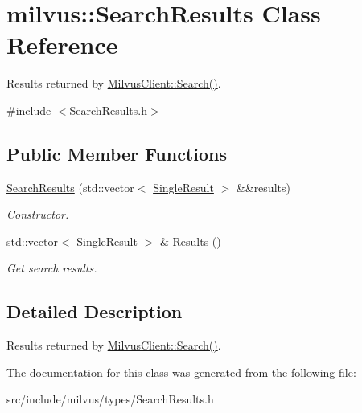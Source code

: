 \hypertarget{classmilvus_1_1_search_results}{}\section{milvus\+:\+:Search\+Results Class Reference}
\label{classmilvus_1_1_search_results}


Results returned by \hyperlink{classmilvus_1_1_milvus_client_a46c70fc2b7c386003babd90e02b299d1}{Milvus\+Client\+::\+Search()}.  




{\ttfamily \#include $<$Search\+Results.\+h$>$}

\subsection*{Public Member Functions}
\begin{DoxyCompactItemize}
\item 
\mbox{\label{classmilvus_1_1_search_results_ae1be254fff5abc170a500cb50ffb9190}} 
\hyperlink{classmilvus_1_1_search_results_ae1be254fff5abc170a500cb50ffb9190}{Search\+Results} (std\+::vector$<$ \hyperlink{structmilvus_1_1_single_result}{Single\+Result} $>$ \&\&results)
\begin{DoxyCompactList}\small\item\em Constructor. \end{DoxyCompactList}\item 
\mbox{\label{classmilvus_1_1_search_results_a6cbc63ac98610020398d888188747704}} 
std\+::vector$<$ \hyperlink{structmilvus_1_1_single_result}{Single\+Result} $>$ \& \hyperlink{classmilvus_1_1_search_results_a6cbc63ac98610020398d888188747704}{Results} ()
\begin{DoxyCompactList}\small\item\em Get search results. \end{DoxyCompactList}\end{DoxyCompactItemize}


\subsection{Detailed Description}
Results returned by \hyperlink{classmilvus_1_1_milvus_client_a46c70fc2b7c386003babd90e02b299d1}{Milvus\+Client\+::\+Search()}. 

The documentation for this class was generated from the following file\+:\begin{DoxyCompactItemize}
\item 
src/include/milvus/types/Search\+Results.\+h\end{DoxyCompactItemize}
